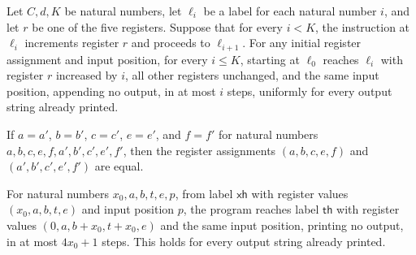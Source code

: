 \begin{lemma}
\label{Complexity.UTab.Front.goes_incChain}
\leanok
{}
Let $C,d,K$ be natural numbers, let $\ell_i$ be a label for each natural number $i$, and
let $r$ be one of the five registers. Suppose that for every $i<K$, the instruction at
$\ell_i$ increments register $r$ and proceeds to $\ell_{i+1}$. For any initial register
assignment and input position, for every $i\le K$, starting at $\ell_0$ reaches $\ell_i$
with register $r$ increased by $i$, all other registers unchanged, and the same input
position, appending no output, in at most $i$ steps, uniformly for every output string
already printed.
\end{lemma}

\begin{lemma}
\label{Complexity.UTab.Front.rv_congr}
\leanok
{}
If $a=a'$, $b=b'$, $c=c'$, $e=e'$, and $f=f'$ for natural numbers
$a,b,c,e,f,a',b',c',e',f'$, then the register assignments $(a,b,c,e,f)$ and
$(a',b',c',e',f')$ are equal.
\end{lemma}

\begin{lemma}
\label{Complexity.UTab.Front.goes_xloop}
\leanok
{}
For natural numbers $x_0,a,b,t,e,p$, from label $\mathsf{xh}$ with register values
$(x_0,a,b,t,e)$ and input position $p$, the program reaches label $\mathsf{th}$ with
register values $(0,a,b+x_0,t+x_0,e)$ and the same input position, printing no output,
in at most $4x_0+1$ steps. This holds for every output string already printed.
\end{lemma}

